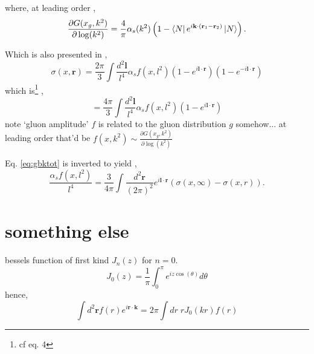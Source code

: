 \documentclass[12pt]{article}
\newcommand{\pairdot}[2]{ \mathbf{#1}\cdot\mathbf{#2}  }
\begin{document}
where, at leading order \cite{nikolaev1994},
\begin{equation}
\frac{\partial G(x_g,k^2)}{\partial \log(k^2)}=\frac{4}{\pi}\alpha_s(k^2) \left(1-\bra{N}e^{i\mathbf{k}\cdot (\mathbf{r}_1-\mathbf{r}_2)}\ket{N}\right).
\end{equation}



Which is also presented in \cite{gbk2002},
\begin{equation}
\sigma(x,\mathbf{r})=\frac{2\pi}{3}\int\frac{d^2 \mathbf{l}}{l^4}\alpha_s f(x,l^2) (1-e^{i \pairdot{l}{r}})(1-e^{-i \pairdot{l}{r}})
\end{equation}
which is\footnote{ cf \cite{ivanov2002} eq. 4} ,
\begin{equation}
=\frac{4\pi}{3}\int\frac{d^2 \mathbf{l}}{l^4}\alpha_s f(x,l^2) (1-e^{i \pairdot{l}{r}})
\label{eq:gbktot}
\end{equation}
note `gluon amplitude' $f$ is related to  the gluon distribution $g$ somehow... 
at leading order that'd be $f(x,k^2)\sim  \frac{\partial G(x_g,k^2)}{\partial \log(k^2)}$ 


Eq. \ref{eq:gbktot} is inverted to yield \cite{gbk2002},
\begin{equation}
\frac{ \alpha_s f(x,l^2)}{l^4}=\frac{3}{4\pi} \int\frac{d^2 \mathbf{r}}{(2\pi)^2} e^{i\pairdot{l}{r}}\left(\sigma(x,\infty)-\sigma(x,r)\right).
\end{equation}

\section{something else}
bessels function of first kind $J_n(z)$ for $n=0$.
\begin{equation}
J_0(z)=\frac{1}{\pi}\int^\pi_0 e^{i z \cos(\theta)}d\theta
\end{equation}
hence,
\begin{equation}
\int d^2\mathbf{r} f(r) e^{i \mathbf{r}\cdot \mathbf{k}}=2\pi \int dr \;r J_0(kr) f(r)
\end{equation}






\newpage
\printbibliography
\end{document}
